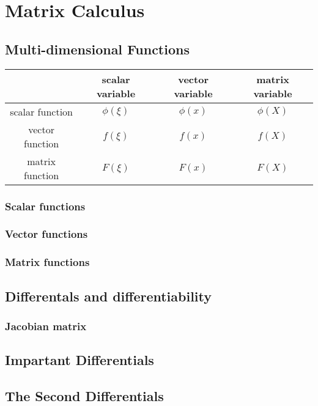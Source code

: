 \chapter{Matrix Calculus}



\section{Multi-dimensional Functions}

\begin{center}
\begin{tabular}{cccc}
\hline
& scalar variable & vector variable & matrix variable \\
\hline
scalar function & $\phi(\xi)$ & $\phi(x)$ & $\phi(X)$  \\
vector function & $f(\xi)$ & $f(x)$ & $f(X)$  \\
matrix function & $F(\xi)$ & $F(x)$ & $F(X)$  \\
\hline
\end{tabular}
\end{center}


\subsection{Scalar functions}

\subsection{Vector functions}

\subsection{Matrix functions}

\section{Differentals and differentiability}

\subsection{Jacobian matrix}

\section{Impartant Differentials}




\section{The Second Differentials}

